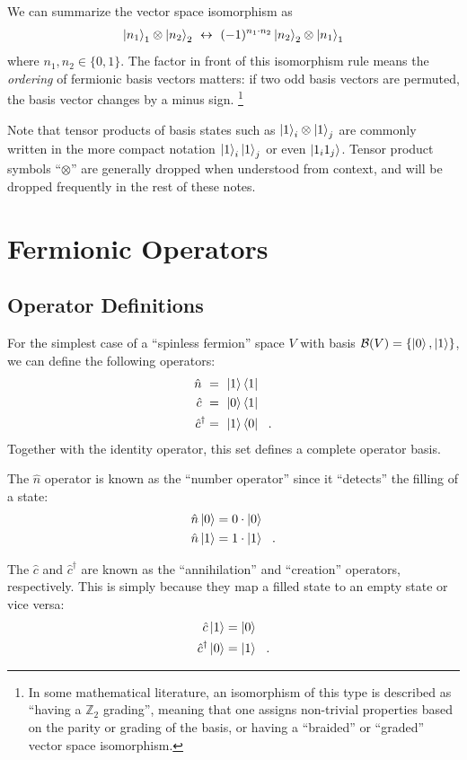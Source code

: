 \documentclass[aps, superscriptaddress, floatfix, onecolumn]{revtex4-2}
\begin{document}
We can summarize the vector space isomorphism as
\begin{align}
     \ket{n_1}_1 \otimes \ket{n_2}_2 \ \leftrightarrow\ (-1)^{n_1 \cdot n_2} \ket{n_2}_2 \otimes \ket{n_1}_1 
\end{align}
where $n_1, n_2 \in \{0,1\}$.
The factor in front of this isomorphism rule means the \emph{ordering} of fermionic basis vectors matters: if two odd basis vectors are permuted, the basis vector changes by a minus sign. 
\footnote{In some mathematical literature, an isomorphism of this type is described as ``having a $\mathbb{Z}_2$ grading'', meaning that one assigns non-trivial properties based on the parity or grading of the basis, or having a ``braided'' or ``graded'' vector space isomorphism.}

Note that tensor products of basis states such as $\ket{1}_i \otimes \ket{1}_j$ are commonly written in the more compact notation $\ket{1}_i \ket{1}_j$ or even $\ket{1_i 1_j}$. Tensor product symbols ``$\otimes$'' are generally dropped when understood from context, and will be dropped frequently in the rest of these notes.


\section{Fermionic Operators}

\subsection{Operator Definitions}

For the simplest case of a ``spinless fermion'' space $V$ with basis $\mathcal{B}(V) = \{ \ket{0}, \ket{1} \}$, we can define the following operators:
\begin{align}
\hat{n}\ &= \ \ket{1} \bra{1} \\ 
\hat{c}\ &= \ \ket{0} \bra{1} \\ 
\hat{c}^\dagger &= \ \ket{1} \bra{0}  \ \ .
\end{align}
Together with the identity operator, this set defines a complete operator basis.

The $\hat{n}$ operator is known as the ``number operator''
since it ``detects'' the filling of a state:
\begin{align}
\hat{n} \ket{0}  &= 0 \cdot \ket{0}  \nonumber \\ 
\hat{n} \ket{1}  &= 1 \cdot \ket{1}  \ \ .
\end{align}

The $\hat{c}$ and $\hat{c}^\dagger$ are known as the ``annihilation'' and ``creation'' operators, respectively. This is simply because they map a filled state to an empty state or vice versa:
\begin{align}
\hat{c} \ket{1}  &= \ket{0}  \\ 
\hat{c}^\dagger \ket{0}  &= \ket{1}  \ \ .
\end{align}
\end{document}
